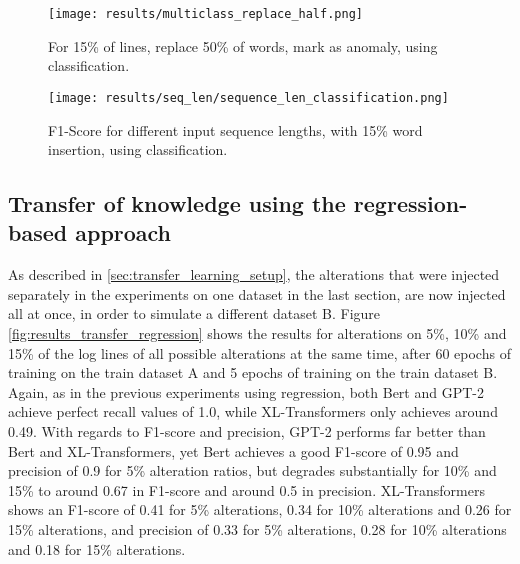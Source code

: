 \begin{figure}[H]
  \centering
  \captionsetup{justification=centering}
  \texttt{[image: results/multiclass\_replace\_half.png]}\\
  \caption{For 15\% of lines, replace 50\% of words, mark as anomaly, using classification.}
  \label{fig:replace_words_classification}
\end{figure}


\begin{figure}[H]
\centering
  \captionsetup{justification=centering}
  \texttt{[image: results/seq\_len/sequence\_len\_classification.png]}\\
  \caption{F1-Score for different input sequence lengths, with 15\% word insertion, using classification.}
  \label{fig:seq_len_classification}
\end{figure}





\subsection{Transfer of knowledge using the regression-based approach \label{sec:results-regression-transfer}}

As described in \ref{sec:transfer_learning_setup}, the alterations that were injected separately in the experiments on one dataset in the last section, are now injected all at once, in order to simulate a different dataset B. Figure \ref{fig:results_transfer_regression} shows the results for alterations on 5\%, 10\% and 15\% of the log lines of all possible alterations at the same time, after 60 epochs of training on the train dataset A and 5 epochs of training on the train dataset B. 
Again, as in the previous experiments using regression, both Bert and GPT-2 achieve perfect recall values of 1.0, while XL-Transformers only achieves around 0.49. With regards to F1-score and precision, GPT-2 performs far better than Bert and XL-Transformers, yet Bert achieves a good F1-score of 0.95 and precision of 0.9 for 5\% alteration ratios, but degrades substantially for 10\% and 15\% to around 0.67 in F1-score and around 0.5 in precision. XL-Transformers shows an F1-score of 0.41 for 5\% alterations, 0.34 for 10\% alterations and 0.26 for 15\% alterations, and precision of 0.33 for 5\% alterations, 0.28 for 10\% alterations and 0.18 for 15\% alterations.

